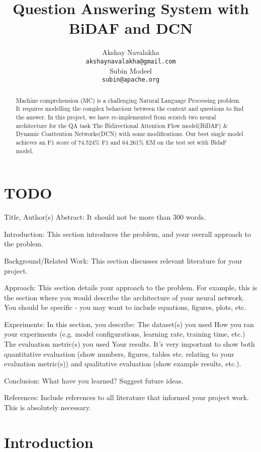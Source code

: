 \documentclass{article} %
\title{Question Answering System with BiDAF and DCN}
\author{
Akshay Navalakha \\
\texttt{akshaynavalakha@gmail.com} \\
\And
Subin Modeel \\
\texttt{subin@apache.org} \\
}
\begin{document}
\maketitle

\begin{abstract}
Machine comprehension (MC) is a challenging Natural Language Processing problem. It requires modelling the complex behaviour between the context and questions to find the answer. In this project, we have re-implemented from scratch two neural architecture for the QA task The Bidirectional Attention Flow
model(BiDAF) \& Dynamic Coattention Networks(DCN) with some modifications. Our best single model achieves an F1 score of  74.524\% F1 and 64.261\% EM on the test set with BidaF model.
\end{abstract}


\section{TODO}
    Title, Author(s)
    Abstract: It should not be more than 300 words.
    
    Introduction: This section introduces the problem, and your overall approach to the problem.
    
    Background/Related Work: This section discusses relevant literature for your project.
    
    Approach: This section details your approach to the problem. For example, this is the section where you would describe the architecture of your neural network. You should be specific - you may want to include equations, figures, plots, etc.
    
    Experiments: In this section, you describe:
        The dataset(s) you used
        How you ran your experiments (e.g. model configurations, learning rate, training time, etc.)
        The evaluation metric(s) you used
        Your results. It's very important to show both quantitative evaluation (show numbers, figures, tables etc. relating to your evaluation metric(s)) and qualitative evaluation (show example results, etc.). 
        
    Conclusion: What have you learned? Suggest future ideas.
    
    References: Include references to all literature that informed your project work. This is absolutely necessary.


\section{Introduction}
\end{document}
